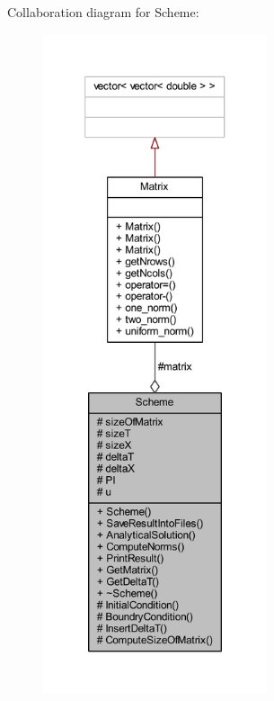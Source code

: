 Collaboration diagram for Scheme\+:\nopagebreak
\begin{figure}[H]
\begin{center}
\leavevmode
\includegraphics[height=550pt]{class_scheme__coll__graph}
\end{center}
\end{figure}
